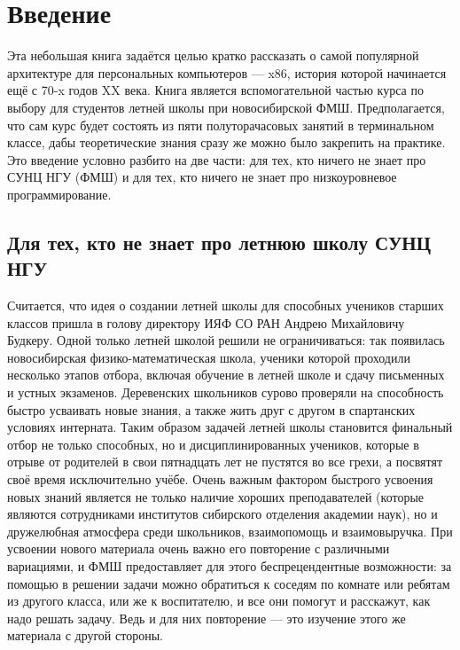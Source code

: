 \chapter{Введение}
Эта небольшая книга задаётся целью кратко рассказать о
самой популярной архитектуре для персональных компьютеров ---
x86, история которой начинается ещё с 70-x годов XX века.
Книга является вспомогательной частью курса по выбору для
студентов летней школы при новосибирской ФМШ. Предполагается,
что сам курс будет состоять из пяти полуторачасовых занятий
в терминальном классе, дабы теоретические знания сразу же
можно было закрепить на практике. Это введение условно
разбито на две части: для тех, кто ничего не знает про
СУНЦ НГУ (ФМШ) и для тех, кто ничего не знает про
низкоуровневое программирование.
\section{Для тех, кто не знает про летнюю школу СУНЦ НГУ}
Считается, что идея о создании летней школы для способных
учеников старших классов пришла в голову директору ИЯФ СО РАН
Андрею Михайловичу Будкеру. Одной только летней школой
решили не ограничиваться: так появилась новосибирская 
физико-математическая школа, ученики которой проходили
несколько этапов отбора, включая обучение в летней школе и
сдачу письменных и устных экзаменов. Деревенских школьников
сурово проверяли на способность быстро усваивать новые знания,
а также жить друг с другом в спартанских условиях интерната.
Таким образом задачей летней школы становится финальный отбор
не только способных, но и дисциплинированных учеников, которые
в отрыве от родителей в свои пятнадцать лет не пустятся во все
грехи, а посвятят своё время исключительно учёбе. Очень важным
фактором быстрого усвоения новых знаний является не только наличие
хороших преподавателей (которые являются сотрудниками
институтов сибирского отделения академии наук), но и 
дружелюбная атмосфера среди школьников, взаимопомощь и взаимовыручка.
При усвоении нового материала очень важно его повторение 
с различными вариациями, и ФМШ предоставляет для этого беспрецендентные
возможности: за помощью в решении задачи можно обратиться к соседям
по комнате или ребятам из другого класса, или же к воспитателю, и все
они помогут и расскажут, как надо решать задачу. Ведь и для них
повторение --- это изучение этого же материала с другой стороны.
